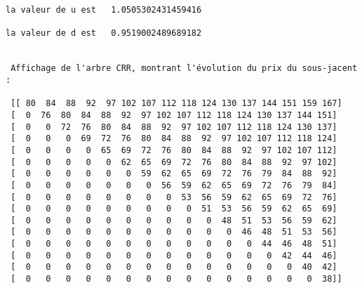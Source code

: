\documentclass[11pt]{article}
\begin{document}
    \begin{Verbatim}[commandchars=\\\{\}]
la valeur de u est   1.0505302431459416

la valeur de d est   0.9519002489689182


 Affichage de l'arbre CRR, montrant l'évolution du prix du sous-jacent :

 [[ 80  84  88  92  97 102 107 112 118 124 130 137 144 151 159 167]
 [  0  76  80  84  88  92  97 102 107 112 118 124 130 137 144 151]
 [  0   0  72  76  80  84  88  92  97 102 107 112 118 124 130 137]
 [  0   0   0  69  72  76  80  84  88  92  97 102 107 112 118 124]
 [  0   0   0   0  65  69  72  76  80  84  88  92  97 102 107 112]
 [  0   0   0   0   0  62  65  69  72  76  80  84  88  92  97 102]
 [  0   0   0   0   0   0  59  62  65  69  72  76  79  84  88  92]
 [  0   0   0   0   0   0   0  56  59  62  65  69  72  76  79  84]
 [  0   0   0   0   0   0   0   0  53  56  59  62  65  69  72  76]
 [  0   0   0   0   0   0   0   0   0  51  53  56  59  62  65  69]
 [  0   0   0   0   0   0   0   0   0   0  48  51  53  56  59  62]
 [  0   0   0   0   0   0   0   0   0   0   0  46  48  51  53  56]
 [  0   0   0   0   0   0   0   0   0   0   0   0  44  46  48  51]
 [  0   0   0   0   0   0   0   0   0   0   0   0   0  42  44  46]
 [  0   0   0   0   0   0   0   0   0   0   0   0   0   0  40  42]
 [  0   0   0   0   0   0   0   0   0   0   0   0   0   0   0  38]]
    \end{Verbatim}
\end{document}

